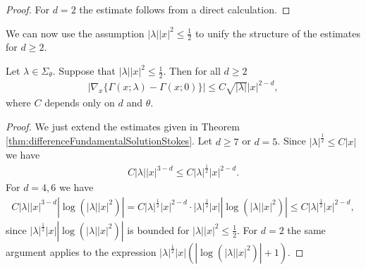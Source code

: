 \begin{proof}
For $d = 2$ the estimate follows from a direct calculation.
\end{proof}

We can now use the assumption $|\lambda||x|^2 \leq \frac{1}{2}$  to unify the structure of the estimates for $d \geq 2$.
\begin{cor}
  \label{cor:differenceFundamentalSolutionStokes}
  Let $\lambda \in \Sigma_\theta$. Suppose that $|\lambda||x|^2 \leq \frac{1}{2}$.
  Then for all $d \geq 2$
  \begin{align*}
    |\nabla_x\{ \Gamma(x; \lambda) - \Gamma(x; 0)\} | \leq C \sqrt{|\lambda|} |x|^{2 - d},
  \end{align*}
  where $C$ depends only on $d$ and $\theta$.
\end{cor}

\begin{proof}
  We just extend the estimates given in Theorem \ref{thm:differenceFundamentalSolutionStokes}.
  Let $d \geq 7$ or $d = 5$. Since $|\lambda|^{\frac{1}{2}} \leq C{|x|}$ we have
  \begin{align*}
    C |\lambda| |x|^{3 - d} \leq C |\lambda|^{\frac{1}{2}} |x|^{2 - d}.
  \end{align*}
  For $d = 4,6$ we have
  \begin{align*}
    C |\lambda| |x|^{3 - d} | \log(|\lambda||x|^2)|
    = C |\lambda|^{\frac{1}{2}} |x|^{2 - d} \cdot |\lambda|^{\frac{1}{2}} |x| | \log(|\lambda| |x|^2) |
    \leq C |\lambda|^{\frac{1}{2}} |x|^{2 - d},
  \end{align*}
  since $|\lambda|^{\frac{1}{2}} |x| |\log(|\lambda| |x|^2)|$ is bounded for $|\lambda| |x|^2 \leq \frac{1}{2}$.
  For $d = 2$ the same argument applies to the expression $|\lambda|^{\frac{1}{2}} |x| (|\log(|\lambda| |x|^2)| + 1)$.
\end{proof}

